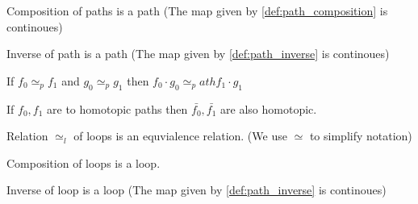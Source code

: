     \begin{lemma}
        \label{lem:path_comp_path}

        Composition of paths is a path (The map given by \ref{def:path_composition} is continoues) 
    \end{lemma}

    \begin{lemma}
        \label{lem:path_inverse_path}

        Inverse of path is a path (The map given by \ref{def:path_inverse} is continoues) 
    \end{lemma}

    \begin{lemma}
        \label{lem:path_comp_homoclass}

        If $f_0 \simeq_p f_1$ and $g_0 \simeq_p g_1$ then $f_0 \cdot g_0 \simeq_path f_1 \cdot g_1$ 
    \end{lemma}

    \begin{lemma}
        \label{lem:path_inverse_homoclass}

        If $f_0,f_1$ are to homotopic paths then $\bar{f_0}, \bar{f_1}$ are also homotopic.
    \end{lemma}

    \begin{theorem}
        \label{thm:loop_homotopy_equiv}

        Relation $\simeq_l$ of loops is an equvialence relation. (We use $\simeq$ to simplify notation)
    \end{theorem}

    \begin{lemma}
        \label{lem:loop_comp_loop}
        
        Composition of loops is a loop.
    \end{lemma}

    \begin{lemma}
        \label{lem:loop_inverse_loop}

        Inverse of loop is a loop (The map given by \ref{def:path_inverse} is continoues) 
    \end{lemma}

